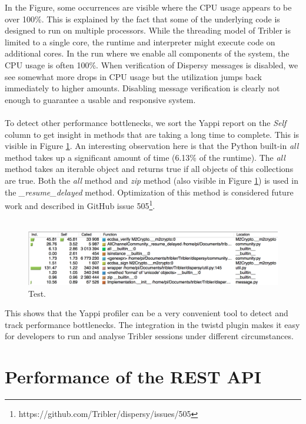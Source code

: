 In the Figure, some occurrences are visible where the CPU usage appears to be over 100\%. This is explained by the fact that some of the underlying code is designed to run on multiple processors. While the threading model of Tribler is limited to a single core, the runtime and interpreter might execute code on additional cores. In the run where we enable all components of the system, the CPU usage is often 100\%. When verification of Dispersy messages is disabled, we see somewhat more drops in CPU usage but the utilization jumps back immediately to higher amounts. Disabling message verification is clearly not enough to guarantee a usable and responsive system.\\\\
To detect other performance bottlenecks, we sort the Yappi report on the \emph{Self} column to get insight in methods that are taking a long time to complete. This is visible in Figure \ref{fig:yappi_breakdown_self}. An interesting observation here is that the Python built-in \emph{all} method takes up a significant amount of time (6.13\% of the runtime). The \emph{all} method takes an iterable object and returns true if all objects of this collections are true. Both the \emph{all} method and \emph{zip} method (also visible in Figure \ref{fig:yappi_breakdown_self}) is used in the \emph{\_resume\_delayed} method. Optimization of this method is considered future work and described in GitHub issue 505\footnote{https://github.com/Tribler/dispersy/issues/505}.\\\\

\begin{figure}[!h]
	\centering
	\includegraphics[width=0.9\columnwidth]{images/experiments/yappi_breakdown_self}
	\caption{Test.}
	\label{fig:yappi_breakdown_self}
\end{figure}

This shows that the Yappi profiler can be a very convenient tool to detect and track performance bottlenecks. The integration in the twistd plugin makes it easy for developers to run and analyse Tribler sessions under different circumstances.

\section{Performance of the REST API}

